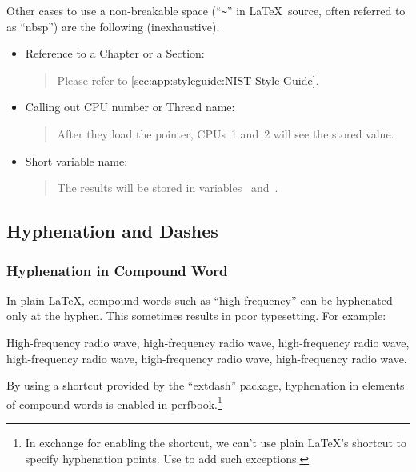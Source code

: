 Other cases to use a non-breakable space (``\verb|~|'' in \LaTeX\
source, often referred to as ``nbsp'')
are the following (inexhaustive).

\begin{itemize}
\item Reference to a Chapter or a Section:
  \begin{quote}
    Please refer to \cref{sec:app:styleguide:NIST Style Guide}.
  \end{quote}
\item Calling out CPU number or Thread name:
  \begin{quote}
    After they load the pointer, CPUs~1 and~2 will see the stored
    value.
  \end{quote}
\item Short variable name:
  \begin{quote}
    The results will be stored in variables~ and~.
  \end{quote}
\end{itemize}

\subsection{Hyphenation and Dashes}
\label{sec:app:styleguide:Hyphenation and Dashes}

\subsubsection{Hyphenation in Compound Word}
\label{sec:app:styleguide:Hyphenation in Compound Word}

In plain \LaTeX, compound words such as ``high-frequency''
can be hyphenated only at the hyphen.
This sometimes results in poor typesetting.
For example:

\begin{center}\begin{minipage}{2.6in}\vspace{0.6\baselineskip}
  High-frequency radio wave, high-frequency radio wave,
  high-frequency radio wave, high-frequency radio wave,
  high-frequency radio wave, high-frequency radio wave.
\vspace{0.6\baselineskip}\end{minipage}\end{center}

By using a shortcut \qco{\\-/} provided by the
``extdash'' package, hyphenation in elements of compound
words is enabled in perfbook.\footnote{
  In exchange for enabling the shortcut, we can't use plain
  \LaTeX's shortcut \qco{\\-} to specify hyphenation points.
  Use  to add such exceptions.
}

